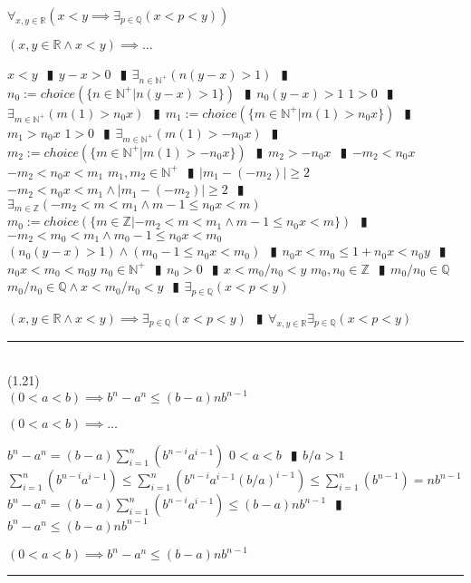 \documentclass{book}
\newcommand{\wff}[1]{\hypertarget{#1}{\fbox{\textcolor{red}{$#1$}}\phantom{--}}}
\newcommand{\abr}{:=}
\newcommand{\pipe}{$\phantom{(}\vrectangleblack\phantom{)}$}
\newcommand{\pr}[1]{\left(#1\right)}
\begin{document}
\wff{QDenseInR} $\forall_{x, y \in \mathbb{R}}\pr{x < y \implies \exists_{p \in \mathbb{Q}}(x < p < y)}$
\begin{enumerate}
  \lit $(x, y \in \mathbb{R} \land x < y) \implies \ldots$
  \begin{enumerate}
    \lit $x < y$ \pipe $y - x > 0$ \pipe $\exists_{n \in \mathbb{N}^+}(n (y - x) > 1)$ \pipe $n_0 \abr choice(\{n \in \mathbb{N}^+ | n (y - x) > 1\})$ \pipe $n_0 (y - x) > 1$
    \lit $1 > 0$ \pipe $\exists_{m \in \mathbb{N}^+}(m (1) > n_0 x)$ \pipe $m_1 \abr choice(\{m \in \mathbb{N}^+ | m (1) > n_0 x\})$ \pipe $m_1 > n_0 x$
    \lit $1 > 0$ \pipe $\exists_{m \in \mathbb{N}^+}(m (1) > -n_0 x)$ \pipe $m_2 \abr choice(\{m \in \mathbb{N}^+ | m (1) > -n_0 x\})$ \pipe $m_2 > -n_0 x$ \pipe $-m_2 < n_0 x$
    \lit $-m_2 < n_0 x < m_1$
    \lit $m_1, m_2 \in \mathbb{N}^+$ \pipe $|m_1 - (-m_2)| \geq 2$
    \lit $-m_2 < n_0 x < m_1 \land |m_1 - (-m_2)| \geq 2$ \pipe $\exists_{m \in \mathbb{Z}}(-m_2 < m < m_1 \land m - 1 \leq n_0 x < m)$
    \lit $m_0 \abr choice(\{m \in \mathbb{Z} | -m_2 < m < m_1 \land m - 1 \leq n_0 x < m\})$ \pipe $-m_2 < m_0 < m_1 \land m_0 - 1 \leq n_0 x < m_0$
    \lit $(n_0 (y - x) > 1) \land (m_0 - 1 \leq n_0 x < m_0)$ \pipe $n_0 x < m_0 \leq 1 + n_0 x < n_0 y$ \pipe $n_0 x < m_0 < n_0 y$
    \lit $n_0 \in \mathbb{N}^+$ \pipe $n_0 > 0$ \pipe $x < m_0 / n_0 < y$
    \lit $m_0, n_0 \in \mathbb{Z}$ \pipe $m_0 / n_0 \in \mathbb{Q}$
    \lit $m_0 / n_0 \in \mathbb{Q} \land x < m_0 / n_0 < y$ \pipe $\exists_{p \in \mathbb{Q}}(x < p < y)$
  \end{enumerate}
  \lit $(x, y \in \mathbb{R} \land x < y) \implies \exists_{p \in \mathbb{Q}}(x < p < y)$ \pipe $\forall_{x, y \in \mathbb{R}} \exists_{p \in \mathbb{Q}}(x < p < y)$
\end{enumerate} \vspace{.75mm} \hrule \vspace{.75mm} \ \\ 

(1.21) \\
\wff{RootExistenceInRLemma} $(0 < a < b) \implies b^n - a^n \leq (b - a) n b^{n - 1}$
\begin{enumerate}
  \lit $(0 < a < b) \implies \ldots$
  \begin{enumerate}
    \lit $b^n - a^n = (b - a) \sum_{i = 1}^{n}(b^{n - i} a^{i - 1})$
    \lit $0 < a < b$ \pipe $b/a > 1$
    \lit $\sum_{i = 1}^{n}(b^{n - i} a^{i - 1}) \leq \sum_{i = 1}^{n}(b^{n - i} a^{i - 1} (b / a)^{i - 1}) \leq \sum_{i = 1}^{n}(b^{n - 1}) = n b^{n - 1}$
    \lit $b^n - a^n = (b - a) \sum_{i = 1}^{n}(b^{n - i} a^{i - 1}) \leq (b - a) n b^{n - 1}$ \pipe $b^n - a^n \leq (b - a) n b^{n - 1}$
  \end{enumerate}
  \lit $(0 < a < b) \implies b^n - a^n \leq (b - a) n b^{n - 1}$
\end{enumerate} \vspace{.75mm} \hrule \vspace{.75mm} \ \\ 
\end{document}
